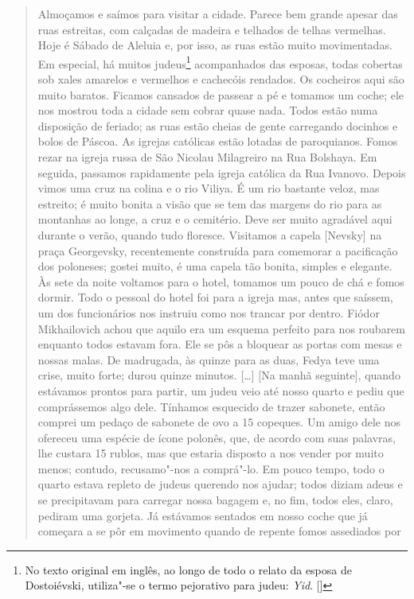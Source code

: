 \begin{quote}
Almoçamos e saímos para visitar a cidade. Parece bem grande apesar das
ruas estreitas, com calçadas de madeira e telhados de telhas vermelhas.
Hoje é Sábado de Aleluia e, por isso, as ruas estão muito movimentadas.
Em especial, há muitos judeus\footnote{No texto original em inglês, ao longo de todo o relato da esposa de Dostoiévski, utiliza"-se o termo pejorativo para judeu: \textit{Yid}. []} acompanhados das esposas, todas cobertas sob xales amarelos e vermelhos e cachecóis rendados. Os
cocheiros aqui são muito baratos. Ficamos cansados de passear a pé e
tomamos um coche; ele nos mostrou toda a cidade sem cobrar quase nada.
Todos estão numa disposição de feriado; as ruas estão cheias de gente
carregando docinhos e bolos de Páscoa. As igrejas católicas estão
lotadas de paroquianos. Fomos rezar na igreja russa de São Nicolau
Milagreiro na Rua Bolshaya. Em seguida, passamos rapidamente pela igreja
católica da Rua Ivanovo. Depois vimos uma cruz na colina e o rio Viliya.
É um rio bastante veloz, mas estreito; é muito bonita a visão que se tem
das margens do rio para as montanhas ao longe, a cruz e o cemitério.
Deve ser muito agradável aqui durante o verão, quando tudo floresce.
Visitamos a capela {[}Nevsky{]} na praça Georgevsky, recentemente
construída para comemorar a pacificação dos poloneses; gostei muito, é
uma capela tão bonita, simples e elegante. Às sete da noite voltamos
para o hotel, tomamos um pouco de chá e fomos dormir. Todo o pessoal do
hotel foi para a igreja mas, antes que saíssem, um dos funcionários nos
instruiu como nos trancar por dentro. Fiódor Mikhailovich achou que
aquilo era um esquema perfeito para nos roubarem enquanto todos estavam
fora. Ele se pôs a bloquear as portas com mesas e nossas malas. De
madrugada, às quinze para as duas, Fedya teve uma crise, muito forte;
durou quinze minutos. [\ldots{}] {[}Na manhã seguinte{]}, quando estávamos
prontos para partir, um judeu veio até nosso quarto e pediu que
comprássemos algo dele. Tínhamos esquecido de trazer sabonete, então
comprei um pedaço de sabonete de ovo a 15 copeques. Um amigo dele nos
ofereceu uma espécie de ícone polonês, que, de acordo com suas palavras,
lhe custara 15 rublos, mas que estaria disposto a nos vender por muito
menos; contudo, recusamo"-nos a comprá"-lo. Em pouco tempo, todo o quarto
estava repleto de judeus querendo nos ajudar; todos diziam adeus e se
precipitavam para carregar nossa bagagem e, no fim, todos eles, claro,
pediram uma gorjeta. Já estávamos sentados em nosso coche que já
começara a se pôr em movimento quando de repente fomos assediados por

\end{quote}
